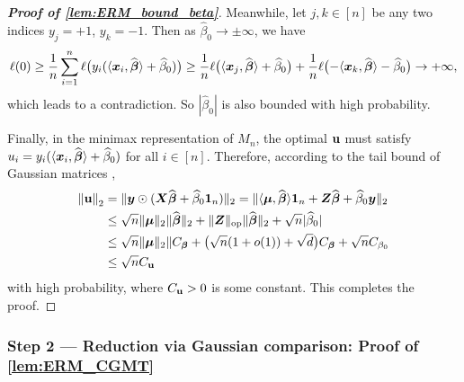 \begin{proof}[\textbf{Proof of \cref{lem:ERM_bound_beta}}]
    Meanwhile, let $j, k \in [n]$ be any two indices $y_j = +1$, $y_k = -1$. Then as $\hat\beta_0 \to \pm\infty$, we have
    \begin{equation*}
        \ell(0) \ge \frac1n \sum_{i=1}^n \ell\bigl( 
            y_i(\langle \text{\boldmath $x$}_i, \widehat{\text{\boldmath $\beta$}} \rangle +  \widehat\beta_0 ) \bigr)
        \ge
        \frac1n \ell\bigl( \langle \text{\boldmath $x$}_j, \widehat{\text{\boldmath $\beta$}} \rangle +  \widehat\beta_0 \bigr)
        +
        \frac1n \ell\bigl( - \langle \text{\boldmath $x$}_k, \widehat{\text{\boldmath $\beta$}} \rangle - \widehat\beta_0 \bigr)
        \to +\infty,
    \end{equation*}
    which leads to a contradiction. So $|\hat\beta_0|$ is also bounded with high probability.

    Finally, in the minimax representation of $M_n$, the optimal $\mathrm{\bf u}$ must satisfy $u_i = y_i(\langle \text{\boldmath $x$}_i, \widehat{\text{\boldmath $\beta$}} \rangle +  \widehat\beta_0 )$ for all $i \in [n]$. Therefore, according to the tail bound of Gaussian matrices \cite[Corollary 7.3.3]{vershynin2018high},
    \begin{align*}
            \left\|{\mathrm{\bf u}}\right\|_2 & = \| \text{\boldmath $y$} \odot (\text{\boldmath $X$} \widehat{\text{\boldmath $\beta$}} + \widehat\beta_0 \mathrm{\bf 1}_n ) \|_2
            = \| \langle \text{\boldmath $\mu$}, \widehat{\text{\boldmath $\beta$}} \rangle \mathrm{\bf 1}_n + \text{\boldmath $Z$} \widehat{\text{\boldmath $\beta$}} + \widehat\beta_0 \text{\boldmath $y$} \|_2 \\
            & \le \sqrt{n} \| \text{\boldmath $\mu$} \|_2 \| \widehat{\text{\boldmath $\beta$}} \|_2 +
            \| \text{\boldmath $Z$} \|_{\mathrm{op}} \| \widehat{\text{\boldmath $\beta$}} \|_2 + \sqrt{n} | \widehat\beta_0 | \\
            & \le \sqrt{n} \| \text{\boldmath $\mu$} \|_2 \| C_{\text{\boldmath $\beta$}} + \bigl( \sqrt{n}(1 + o(1)) + \sqrt{d} \bigr) C_{\text{\boldmath $\beta$}} 
            + \sqrt{n} C_{\beta_0} \\
            & \le \sqrt{n} C_{\mathrm{\bf u}}
    \end{align*}
    with high probability, where $C_{\mathrm{\bf u}} > 0$ is some constant. This completes the proof.
\end{proof}






\subsubsection{Step 2 --- Reduction via Gaussian comparison: Proof of \cref{lem:ERM_CGMT}}
\label{subsubsec:under_step2}



